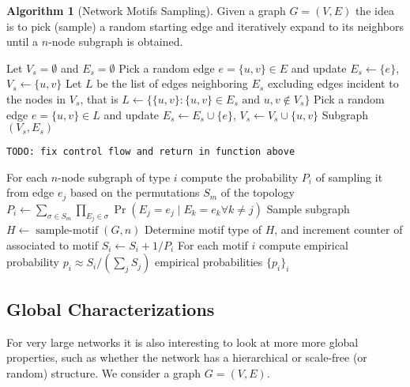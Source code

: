 \documentclass[a4paper]{article}
\newcommand{\todo}[1]{\texttt{TODO: #1}}
\theoremstyle{plain}
\theoremstyle{definition}
\newtheorem{alg}{Algorithm}[section]
\theoremstyle{remark}
\begin{document}
\begin{alg}[Network Motifs Sampling]
  Given a graph $G = (V,E)$ the idea is to pick (sample) a random starting
  edge and iteratively expand to its neighbors until a $n$-node subgraph is
  obtained.
  \begin{algorithmic}
      \State Let $V_s = \emptyset$ and $E_s = \emptyset$
      \Repeat
        \State Pick a random edge $e = \{u,v\} \in E$ and update
          $E_s \gets \{e\}$, $V_s \gets \{u,v\}$
        \Repeat
          \State Let $L$ be the list of edges neighboring $E_s$ excluding edges
            incident to the nodes in $V_s$, that is
          \State $L \gets \{\{u,v\} : \{u,v\} \in E_s \text{ and }  u,v \notin
            V_s\}$
          \State Pick a random edge $e = \{u,v\} \in L$ and update
            $E_s \gets E_s \cup \{e\}$, $V_s \gets V_s \cup \{u,v\}$
        \State \Return Subgraph $(V_s, E_s)$
    \EndFunction
  \end{algorithmic}
  \todo{fix control flow and return in function above}
  \begin{algorithmic}
      \State For each $n$-node subgraph of type $i$ compute the probability
      $P_i$ of sampling it from edge $e_j$ based on the permutations $S_m$ of
      the topology
      \State $P_i \gets \sum_{\sigma \in S_m} \prod_{E_j \in \sigma}
        \Pr (E_j = e_j \mid E_k = e_k \forall k \neq j) $
      \Repeat
        \State Sample subgraph $H \gets \operatorname{sample-motif}(G, n)$
        \State Determine motif type of $H$, and increment counter of
          associated to motif $S_i \gets S_i + 1 / P_i$
      \State For each motif $i$ compute empirical probability
        $p_i \approx S_i / (\sum_{j} S_j)$
      \State \Return empirical probabilities $\{p_i\}_{i}$
    \EndFunction
  \end{algorithmic}
\end{alg}

\subsection{Global Characterizations}

For very large networks it is also interesting to look at more more global
properties, such as whether the network has a hierarchical or scale-free (or
random) structure. We consider a graph $G = (V,E)$.
\end{document}
